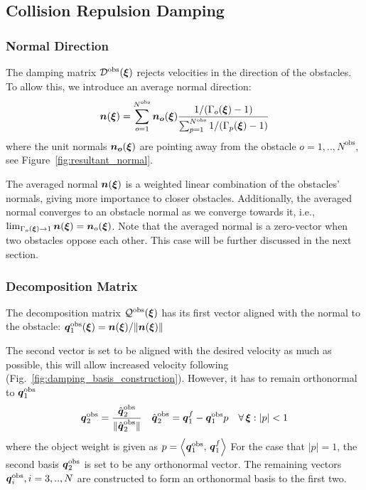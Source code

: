 \subsection{Collision Repulsion Damping} \label{sec:obstacle_repulsion}

\subsubsection{Normal Direction}
The damping matrix $\mathcal{D}^{\mathrm{obs}}(\boldsymbol{\xi})$ rejects velocities in the direction of the obstacles. To allow this, we introduce an average normal direction:
\begin{equation}
  \vecs n(\vecs\xi) = \sum_{o=1}^{N^{\mathrm{obs}}} \vecs{n_o}(\vecs\xi)
  \frac{1 / (\Gamma_o(\vecs \xi) - 1)}{\sum_{p=1}^{N^\mathrm{obs}} 1 / (\Gamma_p(\vecs \xi) - 1)}
  \label{eq:averaged_normal}
\end{equation}
 where the unit normals $\boldsymbol{n_o} (\boldsymbol{\xi})$  are pointing away from the obstacle $o = 1,  ..,  N^{\mathrm{obs}}$, see Figure~\ref{fig:resultant_normal}. 

The averaged normal $\boldsymbol{n}(\boldsymbol{\xi})$ is a weighted linear combination of the obstacles' normals, giving more importance to closer obstacles.
Additionally, the averaged normal converges to an obstacle normal as we converge towards it, i.e., $\lim_{\Gamma_o(\boldsymbol{\xi}) \rightarrow 1} \boldsymbol{n}(\boldsymbol{\xi}) = \boldsymbol{n}_o(\boldsymbol{\xi})$.
Note that the averaged normal is a zero-vector when two obstacles oppose each other. This case will be further discussed in the next section.

\subsubsection{Decomposition Matrix}
The decomposition matrix $\mathcal{Q}^{\mathrm{obs}}(\boldsymbol{\xi})$ has its first vector aligned with the normal to the obstacle:  $\boldsymbol{q}_1^{\mathrm{obs}}(\boldsymbol{\xi}) =  \boldsymbol{n}(\boldsymbol{\xi}) / \lVert\boldsymbol{n}(\boldsymbol{\xi})\rVert$ 

The second vector is set to be aligned with the desired velocity as much as possible, this will allow increased velocity following (Fig.~\ref{fig:damping_basis_construction}). However, it has to remain orthonormal to $\boldsymbol{q}_1^{\mathrm{obs}}$
\begin{equation}
  \boldsymbol{q}_2^{\mathrm{obs}} = \frac{\hat{\boldsymbol{q}}_2^{\mathrm{obs}}}{\| \hat{\boldsymbol{q}}_2^{\mathrm{obs}} \|}
  \quad
  \hat{\boldsymbol{q}}_2^{\mathrm{obs}} = \boldsymbol{q}_1^{f} - \boldsymbol{q}_1^{\mathrm{obs}} p \quad  \forall \, \boldsymbol{\xi} : | p | < 1
\end{equation}
where the object weight is given as $p = \left\langle {\boldsymbol{q}_1^{\mathrm{obs}}}, \, {\boldsymbol{q}_1^{f}} \right\rangle$
For the case that $| p | = 1$, the second basis $\boldsymbol{q}_2^{\mathrm{obs}}$ is set to be any orthonormal vector. The remaining vectors $\boldsymbol{q}_i^{\mathrm{obs}}, i = 3, .., N$ are constructed to form an orthonormal basis to the first two.

